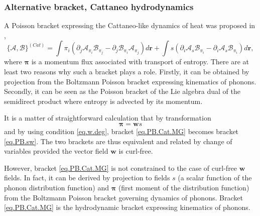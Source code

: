 \documentclass[twoside]{article}
\newcommand{\rr}{{\boldsymbol{r}}}
\newcommand{\ww}{{\boldsymbol{w}}}
\newcommand{\ppi}{\boldsymbol{\pi}}
\newcommand{\AF}{\mathscr{A}}
\newcommand{\BF}{\mathscr{B}}
\newcommand{\pd}{\partial}
\begin{document}
\subsubsection{Alternative bracket, Cattaneo hydrodynamics}
A Poisson bracket expressing the Cattaneo-like dynamics of heat was proposed in 
\cite{Grmela2011a}, 
\begin{equation}\label{eq.PB.Cat.MG}
\{\AF,\BF\}^{(Cat)} = \int \pi_i \left(\pd_j \AF_{\pi_i}\BF_{\pi_j} - 
\pd_j \BF_{\pi_i}\AF_{\pi_j}\right) d\rr  + \int s \left(\pd_i \AF_s 
\BF_{\pi_i} - \pd_i \AF_s \BF_{\pi_i}\right)d\rr ,
\end{equation}
where $\ppi$ is a momentum flux associated with transport of entropy. 
There are at least two reasons why such a bracket plays a role. Firstly, it can 
be obtained by projection from the Boltzmann Poisson bracket expressing 
kinematics of phonons. Secondly, it can be seen as the Poisson bracket of the 
Lie algebra dual of the semidirect product where entropy is advected by its 
momentum.

It is a 
matter 
of straightforward calculation that by transformation 
\begin{equation}
\ppi = \ww s
\end{equation}
and by using condition \eqref{eq.w.deg}, bracket \eqref{eq.PB.Cat.MG} becomes 
bracket \eqref{eq.PB.sw}. The two brackets are thus equivalent and related by 
change of variables provided the vector field $\ww$ is curl-free.

However, bracket \eqref{eq.PB.Cat.MG} is not constrained to the case of 
curl-free $\ww$ fields. In fact, it can be derived by projection to fields $s$ 
(a scalar function of the phonon distribution function) and $\ppi$ (first 
moment of the distribution function) from the Boltzmann Poisson bracket 
governing dynamics of phonons. Bracket \eqref{eq.PB.Cat.MG} is the hydrodynamic 
bracket expressing kinematics of phonons.
\end{document}
